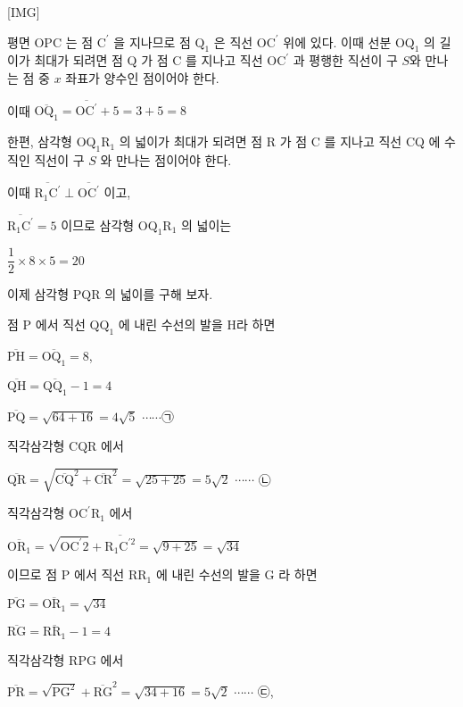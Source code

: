 \documentclass{oblivoir}
\begin{document}
[IMG]

평면 $\mathrm{OPC}$ 는 점 $\mathrm{C}^{\prime}$ 을 지나므로 점 $\mathrm{Q}_{1}$ 은 직선 $\mathrm{OC}^{\prime}$ 위에 있다. 이때 선분 $\mathrm{OQ}_{1}$ 의 길이가 최대가 되려면 점 $\mathrm{Q}$ 가 점 $\mathrm{C}$ 를 지나고 직선 $\mathrm{OC}^{\prime}$ 과 평행한 직선이 구 $S$와 만나는 점 중 $x$ 좌표가 양수인 점이어야 한다.

이때
$\overline{\mathrm{OQ}_{1}}=\overline{\mathrm{OC}^{\prime}}+5=3+5=8$

한편, 삼각형 $\mathrm{OQ}_{1} \mathrm{R}_{1}$ 의 넓이가 최대가 되려면 점 $\mathrm{R}$ 가 점 $\mathrm{C}$ 를 지나고 직선 $\mathrm{CQ}$ 에 수직인 직선이 구 $S$ 와 만나는 점이어야 한다.

이때 $\overline{\mathrm{R}_{1} \mathrm{C}^{\prime}} \perp \overline{\mathrm{OC}^{\prime}}$ 이고, 

$\overline{\mathrm{R}_{1} \mathrm{C}^{\prime}}=5$ 이므로 삼각형 $\mathrm{OQ}_{1} \mathrm{R}_{1}$ 의 넓이는

$\dfrac{1}{2} \times 8 \times 5=20$

이제 삼각형 $\mathrm{PQR}$ 의 넓이를 구해 보자.

점 $\mathrm{P}$ 에서 직선 $\mathrm{QQ}_{1}$ 에 내린 수선의 발을 $\mathrm{H}$라 하면

$\overline{\mathrm{PH}}=\overline{\mathrm{OQ}_{1}}=8$,

$\overline{\mathrm{QH}}=\overline{\mathrm{QQ}_{1}}-1=4$

$\overline{\mathrm{PQ}}=\sqrt{64+16}=4 \sqrt{5}$ $\cdots \cdots$㉠

직각삼각형 $\mathrm{CQR}$ 에서

$\overline{\mathrm{QR}}=\sqrt{\overline{\mathrm{CQ}}^{2}+\overline{\mathrm{CR}}^{2}}=\sqrt{25+25}=5 \sqrt{2}$  $\cdots \cdots$ ㉡

직각삼각형 $\mathrm{OC}^{\prime} \mathrm{R}_{1}$ 에서

$\overline{\mathrm{OR}_{1}}=\sqrt{\mathrm{OC}^{\prime} 2}+\overline{\mathrm{R}_{1} \mathrm{C}^{\prime 2}}=\sqrt{9+25}=\sqrt{34}$

이므로 점 $\mathrm{P}$ 에서 직선 $\mathrm{RR}_{1}$ 에 내린 수선의 발을 $\mathrm{G}$ 라 하면

$\overline{\mathrm{PG}}=\overline{\mathrm{OR}_{1}}=\sqrt{34}$

$\overline{\mathrm{RG}}=\overline{\mathrm{RR}_{1}}-1=4$

직각삼각형 $\mathrm{RPG}$ 에서

$\overline{\mathrm{PR}}=\sqrt{\mathrm{PG}^{2}}+\overline{\mathrm{RG}}^{2}=\sqrt{34+16}=5 \sqrt{2}$  $\cdots \cdots$ ㉢,
\end{document}
